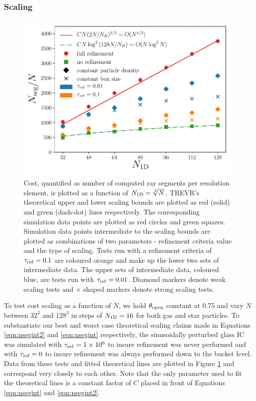 \documentclass[fleq,usenatbib]{mnras}
\newcommand{\acro}{TREVR}
\providecommand{\e}[1]{\ensuremath{\times10^{#1}}}
\newcommand{\tr}{\tau_{\rm ref}}
\newcommand{\tO}{\theta_{\rm open}}
\begin{document}
\subsubsection{Scaling}
\begin{figure}
\includegraphics[width=1\linewidth]{Figures/particle_scaling.pdf}
\caption{Cost, quantified as number of computed ray segments per resolution 
element, is plotted as a function of $N_{\rm 1D} = \sqrt[3]{N}$. \acro{}'s 
theoretical upper and lower scaling bounds are plotted as red (solid) and 
green (dash-dot) lines respectively. The corresponding simulation data 
points are plotted as red circles and green squares. Simulation data points 
intermediate to the scaling bounds are plotted as combinations of two 
parameters - refinement criteria value and the type of scaling. Tests run 
with a refinement criteria of $\tr=0.1$ are coloured orange and make up the 
lower two sets of intermediate data. The upper sets of intermediate data, 
coloured blue, are tests run with $\tr=0.01$. Diamond markers denote weak 
scaling tests and $\times$ shaped markers denote strong scaling tests.}
\label{fig:pscale}
\end{figure}
To test cost scaling as a function of $N$, we hold $\tO$ constant at 0.75 and
vary $N$ between $32^3$ and $128^3$ in steps of $N_{\rm 1D} = 16$ for both gas 
and star particles. To substantiate our best and worst case theoretical 
scaling claims made in Equations \ref{eqn:nsegint2} and \ref{eqn:nsegint} 
respectively, the sinusoidally perturbed glass IC was simulated with 
$\tr=1\e 6$ to insure refinement was never performed and with $\tr=0$ to 
insure refinement was always performed down to the bucket level. Data from 
these tests and fitted theoretical lines are plotted in Figure 
\ref{fig:pscale} and correspond very closely to each other. Note that the only 
parameter used to fit the theoretical lines is a constant factor of $C$ placed 
in front of Equations \ref{eqn:nsegint} and \ref{eqn:nsegint2}.
\end{document}
